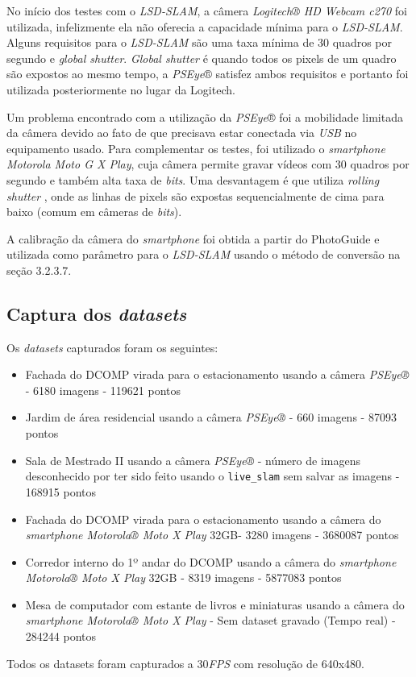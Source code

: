 No início dos testes com o \textit{LSD-SLAM}, a câmera \textit{Logitech® HD Webcam c270} 
foi utilizada, infelizmente ela não oferecia a capacidade mínima para o \textit{LSD-SLAM}.
 Alguns requisitos para o \textit{LSD-SLAM} são uma taxa mínima de 30 quadros por segundo e
 \textit{global shutter}. \textit{Global shutter} é quando todos os pixels de um quadro são 
 expostos ao mesmo tempo, a \textit{PSEye}® satisfez ambos requisitos e portanto 
 foi utilizada posteriormente no lugar da Logitech.
 
 Um problema encontrado com a utilização da \textit{PSEye}® foi a mobilidade 
 limitada da câmera devido ao fato de que precisava estar conectada via \textit{USB}
 no equipamento usado. Para complementar os testes, foi utilizado o \textit{smartphone}
 \textit{Motorola Moto G X Play}, cuja câmera permite gravar vídeos com 30 quadros por
 segundo e também alta taxa de \textit{bits}. Uma desvantagem é que utiliza \textit{rolling shutter}
 , onde as linhas de pixels são expostas sequencialmente de cima para baixo 
 (comum em câmeras de \textit{bits}). 
 
 A calibração da câmera do \textit{smartphone} foi obtida a partir do PhotoGuide e 
 utilizada como parâmetro para o \textit{LSD-SLAM} usando o método de conversão 
 na seção 3.2.3.7.
 
\subsection{Captura dos \textit{datasets}}

Os \textit{datasets} capturados foram os seguintes:

\begin{itemize}
	\item{Fachada do DCOMP virada para o estacionamento usando a câmera \textit{PSEye®} - 6180 imagens - 119621 pontos}
	\item{Jardim de área residencial usando a câmera \textit{PSEye®} - 660 imagens - 87093 pontos}
	\item{Sala de Mestrado II usando a câmera \textit{PSEye®} - número de imagens desconhecido por ter sido feito usando o \texttt{live\_slam} sem salvar as imagens - 168915 pontos}
	\item{Fachada do DCOMP virada para o estacionamento usando a câmera do \textit{smartphone Motorola® Moto X Play} 32GB- 3280 imagens - 3680087 pontos}
	\item{Corredor interno do 1º andar do DCOMP usando a câmera do \textit{smartphone Motorola® Moto X Play} 32GB - 8319 imagens  - 5877083 pontos}
	\item{Mesa de computador com estante de livros e miniaturas usando a câmera do \textit{smartphone Motorola® Moto X Play} -  Sem dataset gravado (Tempo real) - 284244 pontos}
\end{itemize}

Todos os datasets foram capturados a 30\textit{FPS} com resolução de 640x480.

